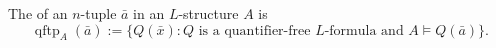 The  of an $n$-tuple $\bar{a}$ in an $L$-structure $A$ is
$$\operatorname{qftp}_A(\bar{a}) := \{Q(\bar{x}) : Q \text{ is a quantifier-free } L\text{-formula and } A \vDash Q(\bar{a})\}.$$
